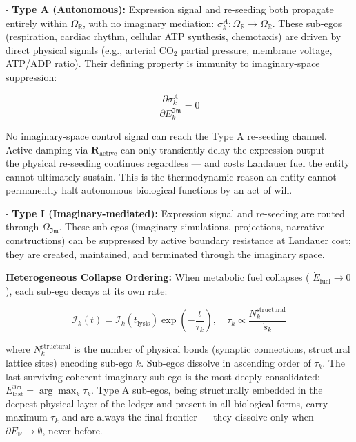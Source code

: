 \documentclass[11pt,a4paper]{article}
\theoremstyle{definition}
\theoremstyle{remark}
\begin{document}
- \textbf{Type A (Autonomous):} Expression signal and re-seeding both propagate entirely within $\Omega_{\mathbb{R}}$, with no imaginary mediation: $\sigma_k^A: \Omega_{\mathbb{R}} \to \Omega_{\mathbb{R}}$. These sub-egos (respiration, cardiac rhythm, cellular ATP synthesis, chemotaxis) are driven by direct physical signals (e.g., arterial CO$_2$ partial pressure, membrane voltage, ATP/ADP ratio). Their defining property is immunity to imaginary-space suppression:


\begin{equation}
\boxed{\frac{\partial \sigma_k^A}{\partial E_k^{\mathfrak{Im}}} = 0}
\end{equation}


No imaginary-space control signal can reach the Type A re-seeding channel. Active damping via $\mathbf{R}_{\text{active}}$ can only transiently delay the expression output — the physical re-seeding continues regardless — and costs Landauer fuel the entity cannot ultimately sustain. This is the thermodynamic reason an entity cannot permanently halt autonomous biological functions by an act of will.

- \textbf{Type I (Imaginary-mediated):} Expression signal and re-seeding are routed through $\Omega_{\mathfrak{Im}}$. These sub-egos (imaginary simulations, projections, narrative constructions) can be suppressed by active boundary resistance at Landauer cost; they are created, maintained, and terminated through the imaginary space.

\textbf{Heterogeneous Collapse Ordering:} When metabolic fuel collapses ( $\dot{E}_{\text{fuel}} \to 0$ ), each sub-ego decays at its own rate:


\begin{equation}
\mathcal{I}_k(t) = \mathcal{I}_k(t_{\text{lysis}})\exp\!\left(-\frac{t}{\tau_k}\right), \quad \tau_k \propto \frac{N_k^{\text{structural}}}{\dot{s}_k}
\end{equation}


where $N_k^{\text{structural}}$ is the number of physical bonds (synaptic connections, structural lattice sites) encoding sub-ego $k$. Sub-egos dissolve in ascending order of $\tau_k$. The last surviving coherent imaginary sub-ego is the most deeply consolidated: $E_{\text{last}}^{\mathfrak{Im}} = \arg\max_k \tau_k$. Type A sub-egos, being structurally embedded in the deepest physical layer of the ledger and present in all biological forms, carry maximum $\tau_k$ and are always the final frontier — they dissolve only when $\partial E_{\mathbb{R}} \to \emptyset$, never before.
\end{document}
